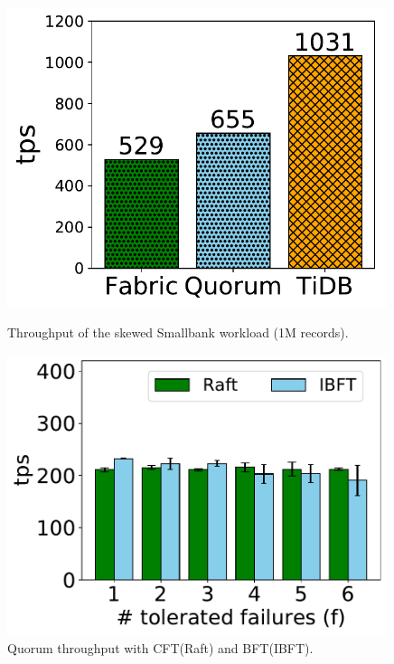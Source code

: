 \begin{figure}[tp]
	\begin{minipage}{0.45\textwidth}
		\centering
        \includegraphics[width=0.99\textwidth]{chart/twin/smallbank.pdf}
		\caption{Throughput of the skewed Smallbank workload (1M records).}
		\label{fig:sb} 
	\end{minipage} \hfill
	\begin{minipage}{0.45\textwidth}
		\centering
		\includegraphics[width=0.99\textwidth]{chart/twin/quorum-consensus.pdf}
		\caption{Quorum throughput with CFT(Raft) and BFT(IBFT).}
		\label{chart:twin:quorum-consensus}
	\end{minipage}
\end{figure}

